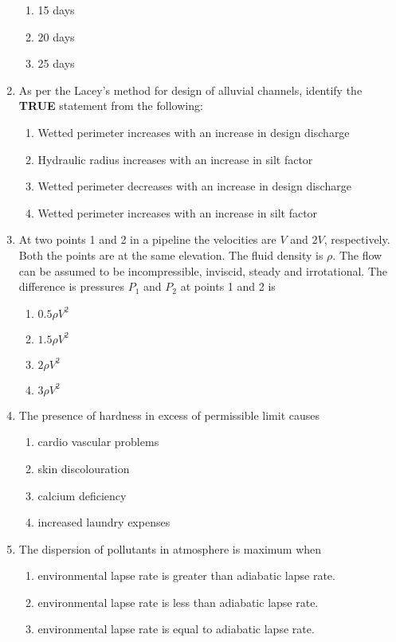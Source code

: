 \documentclass[journal]{IEEEtran}
\begin{document}
\begin{enumerate}
\begin{enumerate}
			\item 15 days
			\item 20 days
			\item 25 days
		\end{enumerate}
	\item
	As per the Lacey's method for design of alluvial channels, identify the \textbf{TRUE} statement from the following:
		\begin{enumerate}
			\item Wetted perimeter increases with an increase in design discharge
			\item Hydraulic radius increases with an increase in silt factor
			\item Wetted perimeter decreases with an increase in design discharge
			\item Wetted perimeter increases with an increase in silt factor
		\end{enumerate}
	\item
	At two points 1 and 2 in a pipeline the velocities are $V$ and $2V$, respectively. Both the points are at the same elevation. The fluid density is $\rho$. The flow can be assumed to be incompressible, inviscid, steady and irrotational. The difference is pressures $P_1$ and $P_2$ at points 1 and 2 is
		\begin{enumerate}
			\item $0.5\rho V^2$
			\item $1.5\rho V^2$
			\item $2\rho V^2$
			\item $3\rho V^2$
		\end{enumerate}
	\item
	The presence of hardness in excess of permissible limit causes 
		\begin{enumerate}
			\item cardio vascular problems
			\item skin discolouration
			\item calcium deficiency
			\item increased laundry expenses
		\end{enumerate}
	\item
	The dispersion of pollutants in atmosphere is maximum when
		\begin{enumerate}
			\item environmental lapse rate is greater than adiabatic lapse rate.
			\item environmental lapse rate is less than adiabatic lapse rate.
			\item environmental lapse rate is equal to adiabatic lapse rate.

\end{enumerate}
\end{enumerate}
\end{document}
